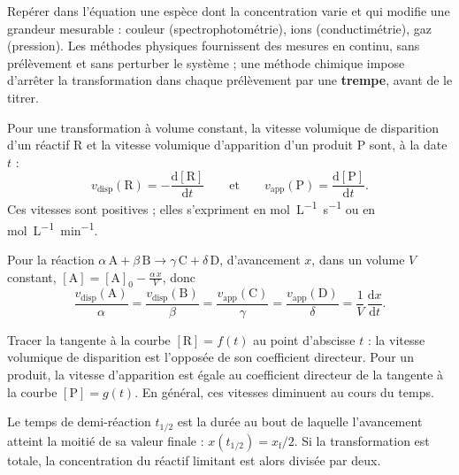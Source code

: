 \begin{savoirfaire}
Repérer dans l'équation une espèce dont la concentration varie et qui modifie une grandeur mesurable : couleur
(spectrophotométrie), ions (conductimétrie), gaz (pression). Les méthodes physiques fournissent des mesures en
continu, sans prélèvement et sans perturber le système ; une méthode chimique impose d'arrêter la transformation dans
chaque prélèvement par une \textbf{trempe}, avant de le titrer.
\end{savoirfaire}
\begin{definition}
Pour une transformation à volume constant, la vitesse volumique de disparition d'un réactif R et la vitesse
volumique d'apparition d'un produit P sont, à la date $t$ :
\[v_\mathrm{disp}(\mathrm{R})=-\frac{\mathrm{d}[\mathrm{R}]}{\mathrm{d}t}\qquad\text{et}\qquad
v_\mathrm{app}(\mathrm{P})=\frac{\mathrm{d}[\mathrm{P}]}{\mathrm{d}t}.\]
Ces vitesses sont positives ; elles s'expriment en \unit{mol.L^{-1}.s^{-1}} ou en \unit{mol.L^{-1}.min^{-1}}.
\end{definition}
\begin{propriete}
Pour la réaction $\alpha\,\mathrm{A}+\beta\,\mathrm{B}\longrightarrow\gamma\,\mathrm{C}+\delta\,\mathrm{D}$,
d'avancement $x$, dans un volume $V$ constant, $[\mathrm{A}]=[\mathrm{A}]_0-\frac{\alpha\,x}{V}$, donc
\[\frac{v_\mathrm{disp}(\mathrm{A})}{\alpha}=\frac{v_\mathrm{disp}(\mathrm{B})}{\beta}=
\frac{v_\mathrm{app}(\mathrm{C})}{\gamma}=\frac{v_\mathrm{app}(\mathrm{D})}{\delta}=\frac{1}{V}\,\frac{\mathrm{d}x}{\mathrm{d}t}.\]
\end{propriete}
\begin{savoirfaire}
Tracer la tangente à la courbe $[\mathrm{R}]=f(t)$ au point d'abscisse $t$ : la vitesse volumique de disparition est
l'opposée de son coefficient directeur. Pour un produit, la vitesse d'apparition est égale au coefficient directeur
de la tangente à la courbe $[\mathrm{P}]=g(t)$. En général, ces vitesses diminuent au cours du temps.
\end{savoirfaire}
\begin{definition}
Le temps de demi-réaction $t_{1/2}$ est la durée au bout de laquelle l'avancement atteint la moitié de sa valeur
finale : $x(t_{1/2})=x_\mathrm{f}/2$. Si la transformation est totale, la concentration du réactif limitant est alors
divisée par deux.
\end{definition}
